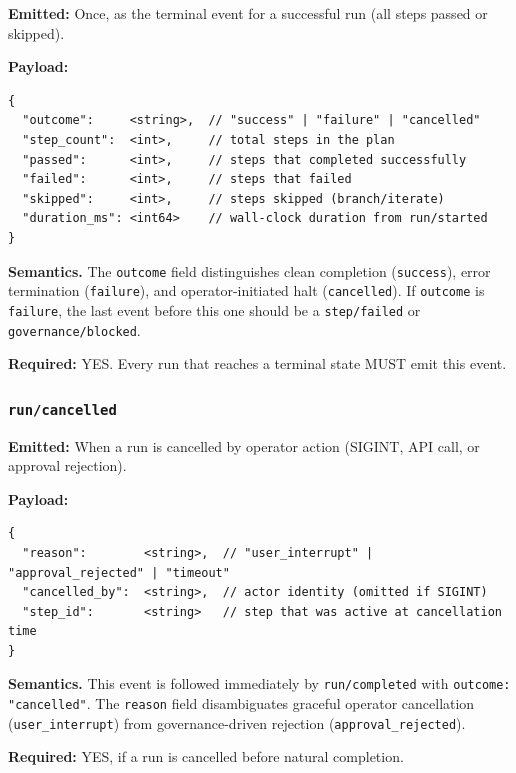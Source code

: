 \textbf{Emitted:} Once, as the terminal event for a successful run (all steps passed or skipped).

\textbf{Payload:}
\begin{verbatim}
{
  "outcome":     <string>,  // "success" | "failure" | "cancelled"
  "step_count":  <int>,     // total steps in the plan
  "passed":      <int>,     // steps that completed successfully
  "failed":      <int>,     // steps that failed
  "skipped":     <int>,     // steps skipped (branch/iterate)
  "duration_ms": <int64>    // wall-clock duration from run/started
}
\end{verbatim}

\textbf{Semantics.} The \texttt{outcome} field distinguishes clean completion (\texttt{success}), error termination (\texttt{failure}), and operator-initiated halt (\texttt{cancelled}). If \texttt{outcome} is \texttt{failure}, the last event before this one should be a \texttt{step/failed} or \texttt{governance/blocked}.

\textbf{Required:} YES. Every run that reaches a terminal state MUST emit this event.


\subsubsection{\texttt{run/cancelled}}

\textbf{Emitted:} When a run is cancelled by operator action (SIGINT, API call, or approval rejection).

\textbf{Payload:}
\begin{verbatim}
{
  "reason":        <string>,  // "user_interrupt" | "approval_rejected" | "timeout"
  "cancelled_by":  <string>,  // actor identity (omitted if SIGINT)
  "step_id":       <string>   // step that was active at cancellation time
}
\end{verbatim}

\textbf{Semantics.} This event is followed immediately by \texttt{run/completed} with \texttt{outcome: "cancelled"}. The \texttt{reason} field disambiguates graceful operator cancellation (\texttt{user\_interrupt}) from governance-driven rejection (\texttt{approval\_rejected}).

\textbf{Required:} YES, if a run is cancelled before natural completion.


